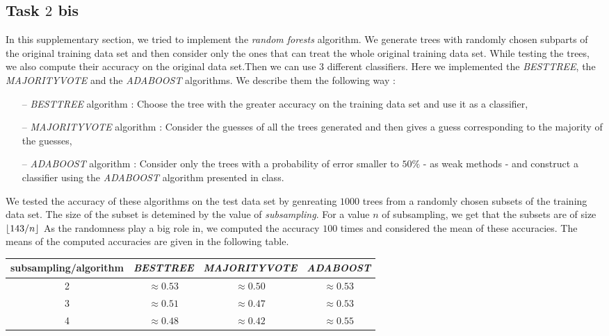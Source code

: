 \documentclass[8pt]{extarticle}
\DeclarePairedDelimiter\floor{\lfloor}{\rfloor}
\begin{document}
\subsection{Task $2$ bis}
	In this supplementary section, we tried to implement the \emph{random forests} algorithm. We generate trees with randomly chosen subparts of the original training data set and then consider only the ones that can treat the whole original training data set. While testing the trees, we also compute their accuracy on the original data set.Then we can use $3$ different classifiers. Here we implemented the \emph{BESTTREE}, the \emph{MAJORITYVOTE} and the \emph{ADABOOST} algorithms. We describe them the following way :
	\begin{itemize}[topsep=0pt,itemsep=0pt,partopsep=0pt, parsep=0pt]
		\item[--] \emph{BESTTREE} algorithm : Choose the tree with the greater accuracy on the training data set and use it as a classifier,
		\item[--] \emph{MAJORITYVOTE} algorithm : Consider the guesses of all the trees generated and then gives a guess corresponding to the majority of the guesses,
		\item[--] \emph{ADABOOST} algorithm : Consider only the trees with a probability of error smaller to $50\%$  - as weak methods - and construct a classifier using the \emph{ADABOOST} algorithm presented in class.
	\end{itemize}
	We tested the accuracy of these algorithms on the test data set by genreating $1000$ trees from a randomly chosen subsets of the training data set. The size of the subset is detemined by the value of \emph{subsampling}. For a value $n$ of subsampling, we get that the subsets are of size $\floor{143/n}$ As the randomness play a big role in, we computed the accuracy $100$ times and considered the mean of these accuracies. The means of the computed accuracies are given in the following table.
	\begin{center}
		\begin{tabular}{ |c|c|c|c| }
			\hline
			subsampling/algorithm& \emph{BESTTREE} & \emph{MAJORITYVOTE} & \emph{ADABOOST}\\
			\hline
			2 & $\approx 0.53$  & $\approx 0.50$ & $\approx 0.53$ \\
			\hline
			3 & $\approx 0.51 $ & $\approx 0.47$ & $\approx 0.53$ \\
			\hline
			4 & $\approx 0.48$ & $\approx 0.42$ & $\approx 0.55$\\
			\hline
		\end{tabular}
	\end{center}
\end{document}

